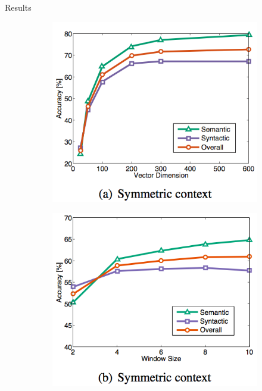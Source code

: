\begin{frame}{Results}
  \begin{figure}
    \centering
    \begin{subfigure}[b]{0.33\textwidth}
      \includegraphics[width=\textwidth]{images/analogy1.png}
    \end{subfigure}%
    \begin{subfigure}[b]{0.33\textwidth}
      \includegraphics[width=\textwidth]{images/analogy2.png}

\end{subfigure}
\end{figure}
\end{frame}
